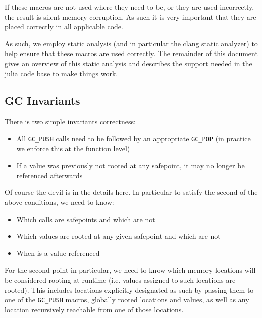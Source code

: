 If these macros are not used where they need to be, or they are used incorrectly, the result is silent memory corruption. As such it is very important that they are placed correctly in all applicable code.



As such, we employ static analysis (and in particular the clang static analyzer) to help ensure that these macros are used correctly. The remainder of this document gives an overview of this static analysis and describes the support needed in the julia code base to make things work.



\hypertarget{15061338110065038518}{}


\subsection{GC Invariants}



There is two simple invariants correctness:



\begin{itemize}
\item All \texttt{GC\_PUSH} calls need to be followed by an appropriate \texttt{GC\_POP} (in practice we enforce this at the function level)


\item If a value was previously not rooted at any safepoint, it may no longer be referenced afterwards

\end{itemize}


Of course the devil is in the details here. In particular to satisfy the second of the above conditions, we need to know:



\begin{itemize}
\item Which calls are safepoints and which are not


\item Which values are rooted at any given safepoint and which are not


\item When is a value referenced

\end{itemize}


For the second point in particular, we need to know which memory locations will be considered rooting at runtime (i.e. values assigned to such locations are rooted). This includes locations explicitly designated as such by passing them to one of the \texttt{GC\_PUSH} macros, globally rooted locations and values, as well as any location recursively reachable from one of those locations.



